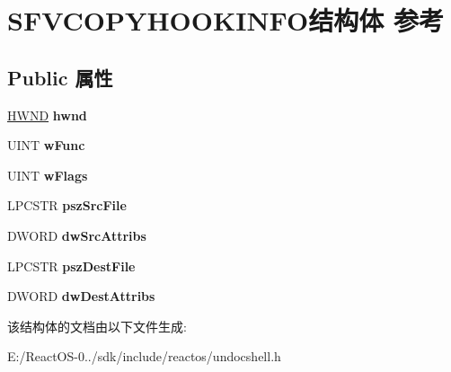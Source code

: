 \hypertarget{struct_s_f_v_c_o_p_y_h_o_o_k_i_n_f_o}{}\section{S\+F\+V\+C\+O\+P\+Y\+H\+O\+O\+K\+I\+N\+F\+O结构体 参考}
\label{struct_s_f_v_c_o_p_y_h_o_o_k_i_n_f_o}
\subsection*{Public 属性}
\begin{DoxyCompactItemize}
\item 
\mbox{\label{struct_s_f_v_c_o_p_y_h_o_o_k_i_n_f_o_a1d9534639cf5591a2d329fb5175103a9}} 
\hyperlink{interfacevoid}{H\+W\+ND} {\bfseries hwnd}
\item 
\mbox{\label{struct_s_f_v_c_o_p_y_h_o_o_k_i_n_f_o_a7f75e83c421ac1dac8c7ab1d0f510e31}} 
U\+I\+NT {\bfseries w\+Func}
\item 
\mbox{\label{struct_s_f_v_c_o_p_y_h_o_o_k_i_n_f_o_aec0eaf81a2287ee9c7fbe08967b4f8c4}} 
U\+I\+NT {\bfseries w\+Flags}
\item 
\mbox{\label{struct_s_f_v_c_o_p_y_h_o_o_k_i_n_f_o_a7f4c3fbea90b5614ba7df90f1ae829d8}} 
L\+P\+C\+S\+TR {\bfseries psz\+Src\+File}
\item 
\mbox{\label{struct_s_f_v_c_o_p_y_h_o_o_k_i_n_f_o_a2f2d3a8563b6ec4f14afffe2c22c9c4b}} 
D\+W\+O\+RD {\bfseries dw\+Src\+Attribs}
\item 
\mbox{\label{struct_s_f_v_c_o_p_y_h_o_o_k_i_n_f_o_a912503f6b45b47f507f22d240cb99d8e}} 
L\+P\+C\+S\+TR {\bfseries psz\+Dest\+File}
\item 
\mbox{\label{struct_s_f_v_c_o_p_y_h_o_o_k_i_n_f_o_a2378c63712acf070d2466efe0593bcff}} 
D\+W\+O\+RD {\bfseries dw\+Dest\+Attribs}
\end{DoxyCompactItemize}


该结构体的文档由以下文件生成\+:\begin{DoxyCompactItemize}
\item 
E\+:/\+React\+O\+S-\/0../sdk/include/reactos/undocshell.\+h\end{DoxyCompactItemize}
